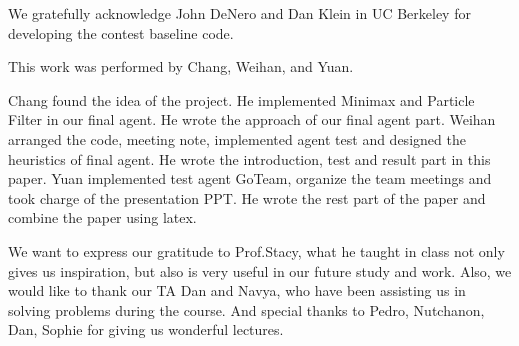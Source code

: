 \begin{acks}
  We gratefully acknowledge John DeNero and Dan Klein in UC Berkeley 
  for developing the contest baseline code. 

  This work was performed by Chang, Weihan, and Yuan.

  Chang found the idea of the project. He implemented Minimax 
  and Particle Filter in our final agent. He
  wrote the approach of our final agent part. 
  Weihan arranged the code, meeting note, implemented agent test and 
  designed the heuristics of final agent. 
  He wrote the introduction, test and result part in this paper.
  Yuan implemented test agent GoTeam, organize the team meetings and 
  took charge of the presentation PPT. He wrote the rest part of the 
  paper and combine the paper using latex.

  We want to express our gratitude to Prof.Stacy, what he taught in
  class not only gives us inspiration, but also is very useful in our 
  future study and work. Also, we would like to thank our TA Dan and Navya,
  who have been assisting us in solving problems during the course.  And special
  thanks to Pedro, Nutchanon, Dan, Sophie for giving us wonderful lectures.

\end{acks}


